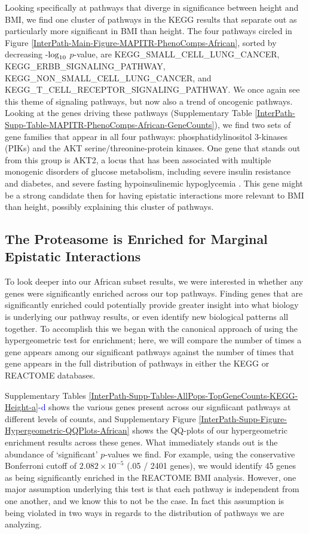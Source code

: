\documentclass[12pt,a4paper]{article}
\def\log{{\rm log}}
\begin{document}
Looking specifically at pathways that diverge in significance between height and BMI, we find one cluster of pathways in the KEGG results that separate out as particularly more significant in BMI than height. The four pathways circled in Figure \ref{InterPath-Main-Figure-MAPITR-PhenoComps-African}, sorted by decreasing -$\log_{10}$ $p$-value, are KEGG\_SMALL\_CELL\_LUNG\_CANCER, KEGG\_ERBB\_SIGNALING\_PATHWAY, KEGG\_NON\_SMALL\_CELL\_LUNG\_CANCER, and KEGG\_T\_CELL\_RECEPTOR\_SIGNALING\_PATHWAY. We once again see this theme of signaling pathways, but now also a trend of oncogenic pathways. Looking at the genes driving these pathways (Supplementary Table \ref{InterPath-Supp-Table-MAPITR-PhenoComps-African-GeneCounts}), we find two sets of gene families that appear in all four pathways: phosphatidylinositol 3-kinases (PIKs) and the AKT serine/threonine-protein kinases. One gene that stands out from this group is AKT2, a locus that has been associated with multiple monogenic disorders of glucose metabolism, including severe insulin resistance and diabetes, and severe fasting hypoinsulinemic hypoglycemia \citep{George2004,Manning2017,Latva-Rasku2018}. This gene might be a strong candidate then for having epistatic interactions more relevant to BMI than height, possibly explaining this cluster of pathways.       

\subsection{The Proteasome is Enriched for Marginal Epistatic Interactions}

To look deeper into our African subset results, we were interested in whether any genes were significantly enriched across our top pathways. Finding genes that are significantly enriched could potentially provide greater insight into what biology is underlying our pathway results, or even identify new biological patterns all together. To accomplish this we began with the canonical approach of using the hypergeometric test for enrichment; here, we will compare the number of times a gene appears among our significant pathways against the number of times that gene appears in the full distribution of pathways in either the KEGG or REACTOME databases. 

Supplementary Tables \ref{InterPath-Supp-Tables-AllPops-TopGeneCounts-KEGG-Height-a}\textcolor{blue}{-d} shows the various genes present across our signfiicant pathways at different levels of counts, and Supplementary Figure \ref{InterPath-Supp-Figure-Hypergeometric-QQPlots-African} shows the QQ-plots of our hypergeometric enrichment results across these genes. What immediately stands out is the abundance of `significant' $p$-values we find. For example, using the conservative Bonferroni cutoff of $2.082\times10^{-5}$ (.05 / 2401 genes), we would identify 45 genes as being significantly enriched in the REACTOME BMI analysis. However, one major assumption underlying this test is that each pathway is independent from one another, and we know this to not be the case. In fact this assumption is being violated in two ways in regards to the distribution of pathways we are analyzing. 
\end{document}
